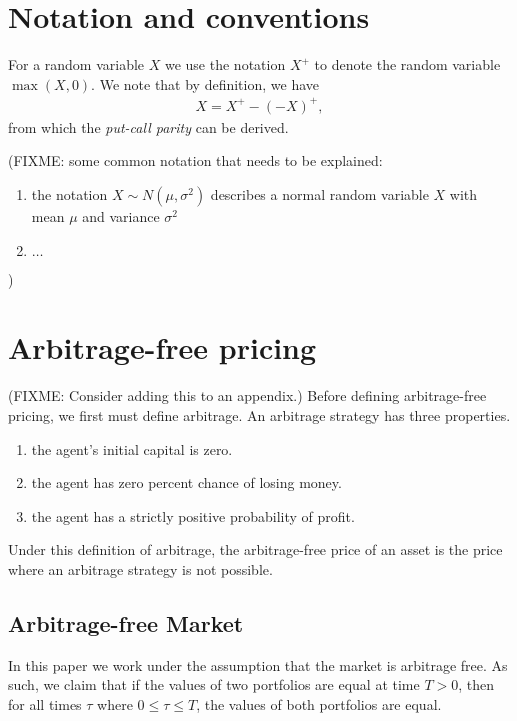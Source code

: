\documentclass[reqno]{amsart}
\begin{document}
\appendix

\section{Notation and conventions}

For a random variable $X$ we use the notation $X^+$ to denote the random variable $\max(X,0)$. We note that by definition, we have 
\begin{align}\label{eq: pos part decomp}
      X = X^+ - (-X)^+,
\end{align}
from which the \emph{put-call parity} can be derived. 

(FIXME: some common notation that needs to be explained: 
\begin{enumerate}
      \item the notation $X \sim N(\mu,\sigma^2)$ describes a normal random variable $X$ with mean $\mu$ and variance $\sigma^2$
      \item $\ldots$
\end{enumerate}
)

\section{Arbitrage-free pricing}

(FIXME: Consider adding this to an appendix.)
Before defining arbitrage-free pricing, we first must define arbitrage. An arbitrage strategy has three properties. 
\begin{enumerate}
     \item the agent's initial capital is zero.
     \item the agent has zero percent chance of losing money.
     \item the agent has a strictly positive probability of profit. 
\end{enumerate}
Under this definition of arbitrage, the arbitrage-free price of an asset is the price where an arbitrage strategy is not possible.

\subsection{Arbitrage-free Market}

In this paper we work under the assumption that the market is arbitrage free. As such, we claim that if the values of two portfolios are equal at time $T > 0$, then for all times $\tau$ where $0 \leq \tau \leq T$, the values of both portfolios are equal.
\end{document}
